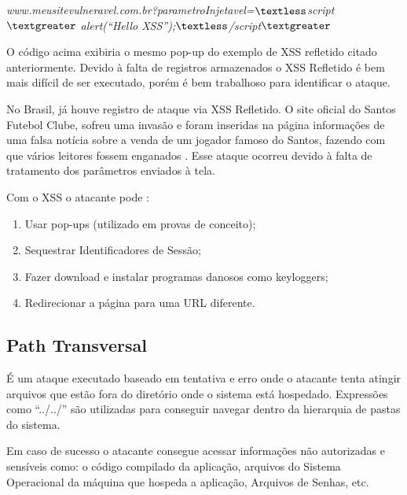 \documentclass[
    12pt,               %
    openright,          %
    oneside,            %
    a4paper,            %
    section=TITLE,     %
    english,            %
    french,             %
    spanish,            %
    brazil              %
    ]{abntex2}
\newcommand{\citep}{\cite}
\begin{document}
\begin{center}
\emph{www.meusitevulneravel.com.br?parametroInjetavel=$\textless$script$\textgreater$ alert(\textquotedblleft{}Hello XSS\textquotedblright{});$\textless$/script$\textgreater$}
\end{center}


O código acima exibiria o mesmo pop-up do exemplo de XSS refletido citado anteriormente. Devido à falta de registros armazenados o XSS Refletido é bem mais difícil de ser executado, porém é bem trabalhoso para identificar o ataque.


No Brasil, já houve registro de ataque via XSS Refletido. O site oficial do Santos Futebol Clube, sofreu uma invasão e foram inseridas na página informações de uma falsa notícia sobre a venda de um jogador famoso do Santos, fazendo com que vários leitores fossem enganados \citep{62233}. Esse ataque ocorreu devido à falta de tratamento dos parâmetros enviados à tela.


Com o XSS o atacante pode \citep{62127}:



\begin{enumerate}[start=1]
	
\item Usar pop-ups (utilizado em provas de conceito);
	
\item Sequestrar Identificadores de Sessão;
	
\item Fazer download e instalar programas danosos como keyloggers;
	
\item Redirecionar a página para uma URL diferente.

\end{enumerate}





\subsection{Path Transversal}

É um ataque executado baseado em tentativa e erro onde o atacante tenta atingir arquivos que estão fora do diretório onde o sistema está hospedado. Expressões como \textquotedblleft{}../../\textquotedblright{} são utilizadas para conseguir navegar dentro da hierarquia de pastas do sistema.\citep{62127}


Em caso de sucesso o atacante consegue acessar informações não autorizadas e sensíveis como: o código compilado da aplicação, arquivos do Sistema Operacional da máquina que hospeda a aplicação, Arquivos de Senhas, etc.
\end{document}
